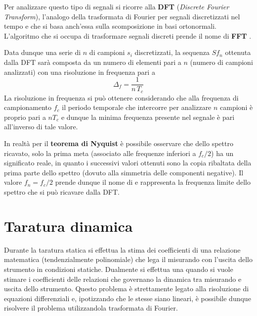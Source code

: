 		Per analizzare questo tipo di segnali si ricorre alla  \textbf{DFT} (\textit{Discrete Fourier Transform}), l'analogo della trasformata di Fourier per segnali discretizzati nel tempo e che si basa anch'essa sulla scomposizione in basi ortonormali. L'algoritmo  che si occupa di trasformare segnali discreti prende il nome di \textbf{FFT} .
		
		Data dunque una serie di $n$ di campioni $s_i$ discretizzati, la sequenza $Sf_n$ ottenuta dalla DFT sarà composta da un numero di elementi pari a $n$ (numero di campioni analizzati) con una risoluzione in frequenza pari a 
		\[ \Delta_f = \frac 1 {n\,T_c}\]
		La risoluzione in frequenza si può ottenere considerando che alla frequenza di campionamento $f_c$ il periodo temporale che intercorre per analizzare $n$ campioni è proprio pari a $n T_c$ e dunque la minima frequenza presente nel segnale è pari all'inverso di tale valore.
		
		In realtà per il \textbf{teorema di Nyquist} è possibile osservare che dello spettro ricavato, solo la prima meta (associato alle frequenze inferiori a $f_c/2$) ha un significato reale, in quanto i successivi valori ottenuti sono la copia ribaltata della prima parte dello spettro (dovuto alla simmetria delle componenti negative). Il valore $f_n = f_c/2$ prende dunque il nome di  e rappresenta la frequenza limite dello spettro che si può ricavare dalla DFT.
		
		
		
\section{Taratura dinamica}
	
	Durante la taratura statica si effettua la stima dei coefficienti di una relazione matematica (tendenzialmente polinomiale) che lega il misurando con l'uscita dello strumento in condizioni statiche. Dualmente si effettua una  quando si vuole stimare i coefficienti delle relazioni che governano la dinamica tra misurando e uscita dello strumento. Questo problema è strettamente legato alla risoluzione di equazioni differenziali e, ipotizzando che le stesse siano lineari, è possibile dunque risolvere il problema utilizzandola trasformata di Fourier.
	
